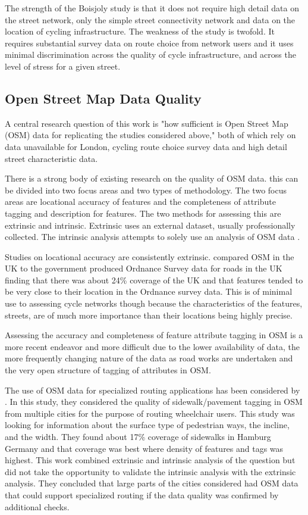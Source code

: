 The strength of the Boisjoly study is that it does not require high detail data on the street network, only the simple street connectivity network and data on the location of cycling infrastructure. The weakness of the study is twofold. It requires substantial survey data on route choice from network users and it uses minimal discrimination across the quality of cycle infrastructure, and across the level of stress for a given street. 

\subsection{Open Street Map Data Quality}\label{OSMQuality}

A central research question of this work is "how sufficient is Open Street Map (OSM) data for replicating the studies considered above," both of which rely on data unavailable for London, cycling route choice survey data and high detail street characteristic data. 

There is a strong body of existing research on the quality of OSM data. this can be divided into two focus areas and two types of methodology. The two focus areas are locational accuracy of features and the completeness of attribute tagging and description for features. The two methods for assessing this are extrinsic and intrinsic. Extrinsic uses an external dataset, usually professionally collected. The intrinsic analysis attempts to solely use an analysis of OSM data . 

Studies on locational accuracy are consistently extrinsic. \textcite{haklay2010good} compared OSM in the UK to the government produced Ordnance Survey data for roads in the UK finding that there was about 24\% coverage of the UK and that features tended to be very close to their location in the Ordnance survey data. This is of minimal use to assessing cycle networks though because the characteristics of the features, streets, are of much more importance than their locations being highly precise. 

Assessing the accuracy and completeness of feature attribute tagging in OSM is a more recent endeavor and more difficult due to the lower availability of data, the more frequently changing nature of the data as road works are undertaken and the very open structure of tagging of attributes in OSM.  

The use of OSM data for specialized routing applications has been considered by \textcite{mobasheri2017crowdsourced}. In this study, they considered the quality of sidewalk/pavement tagging in OSM from multiple cities for the purpose of routing wheelchair users. This study was looking for information about the surface type of pedestrian ways, the incline, and the width. They found about 17\% coverage of sidewalks in Hamburg Germany and that coverage was best where density of features and tags was highest. This work combined extrinsic and intrinsic analysis of the question but did not take the opportunity to validate the intrinsic analysis with the extrinsic analysis. They concluded that large parts of the cities considered had OSM data that could support specialized routing if the data quality was confirmed by additional checks. 

